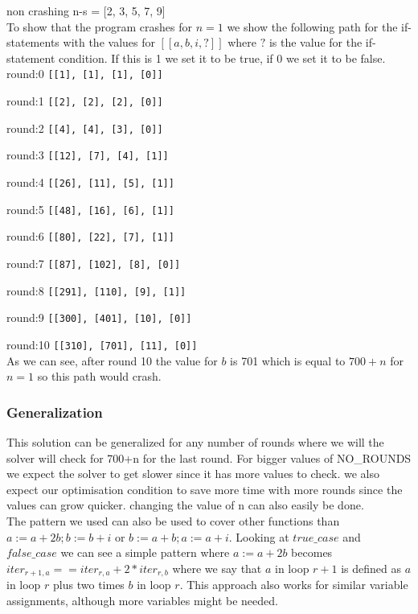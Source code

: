 \documentclass[12pt]{article}
\begin{document}
non crashing n-s = [2, 3, 5, 7, 9]\\

To show that the program crashes for $ n = 1 $ we show the following path for the if-statements with the values for $[[a, b, i, ?]]$ where $?$ is the value for the if-statement condition. If this is 1 we set it to be true, if 0 we set it to be false.\\

round:0
{\tt[[1], [1], [1], [0]]}

round:1
{\tt[[2], [2], [2], [0]]}

round:2
{\tt[[4], [4], [3], [0]]}

round:3
{\tt[[12], [7], [4], [1]]}

round:4
{\tt[[26], [11], [5], [1]]}

round:5
{\tt[[48], [16], [6], [1]]}

round:6
{\tt[[80], [22], [7], [1]]}

round:7
{\tt[[87], [102], [8], [0]]}

round:8
{\tt[[291], [110], [9], [1]]}

round:9
{\tt[[300], [401], [10], [0]]}

round:10
{\tt[[310], [701], [11], [0]]}\\

As we can see, after round 10 the value for $b$ is 701 which is equal to $ 700 + n $ for $ n = 1$ so this path would crash.

\subsubsection*{Generalization}

This solution can be generalized for any number of rounds where we will the solver will check for 700+n for the last round. For bigger values of NO\_ROUNDS we expect the solver to get slower since it has more values to check. we also expect our optimisation condition to save more time with more rounds since the values can grow quicker. 
changing the value of n can also easily be done.
\\
The pattern we used can also be used to cover other functions than ${a := a + 2b; b := b + i}$ or ${b := a + b; a := a + i}$.
Looking at $true\_case$ and $false\_case$ we can see a simple pattern where $a := a +2b$ becomes $iter_{r +1 ,a} == iter_{r,a} + 2*iter_{r,b}$ where we say that $a$ in loop $r +1$ is defined as $a$ in loop $r$ plus two times $b$ in loop $r$. This approach also works for similar variable assignments, although more variables might be needed.
\end{document}
